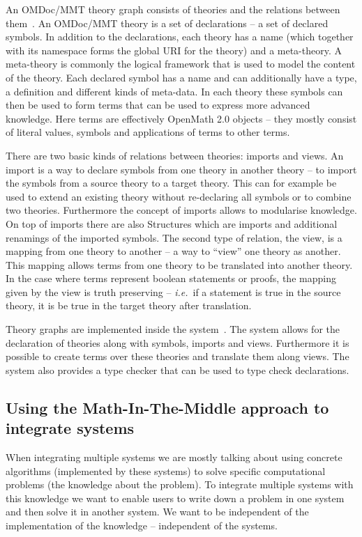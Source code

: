 An OMDoc/MMT theory graph consists of theories and the relations between
them~\cite{RabKoh:WSMSML13}. An OMDoc/MMT theory is a set of declarations -- a set of
declared symbols. In addition to the declarations, each theory has a name (which together
with its namespace forms the global URI for the theory) and a meta-theory. A meta-theory
is commonly the logical framework that is used to model the content of the theory. Each
declared symbol has a name and can additionally have a type, a definition and different
kinds of meta-data. In each theory these symbols can then be used to form terms that can
be used to express more advanced knowledge. Here terms are effectively OpenMath 2.0
\cite{BusCapCar:2oms04} objects -- they mostly consist of literal values, symbols and
applications of terms to other terms.

There are two basic kinds of relations between theories: imports and views. An import is a
way to declare symbols from one theory in another theory -- to import the symbols from a
source theory to a target theory. This can for example be used to extend an existing
theory without re-declaring all symbols or to combine two theories. Furthermore the
concept of imports allows to modularise knowledge. On top of imports there are also
Structures which are imports and additional renamings of the imported symbols. The second
type of relation, the view, is a mapping from one theory to another -- a way to ``view''
one theory as another. This mapping allows terms from one theory to be translated into
another theory. In the case where terms represent boolean statements or proofs, the
mapping given by the view is truth preserving -- \emph{i.e.}~if a statement is true in the
source theory, it is be true in the target theory after translation.

Theory graphs are implemented inside the \MMT system~\cite{Rabe:MAGMS13,uniformal:on}. The
system allows for the declaration of theories along with symbols, imports and
views. Furthermore it is possible to create terms over these theories and translate them
along views. The \MMT system also provides a type checker that can be used to type check
declarations.

\subsection{Using the Math-In-The-Middle approach to integrate systems}\label{sec:mitm}

When integrating multiple systems we are mostly talking about using concrete algorithms
(implemented by these systems) to solve specific computational problems (the knowledge
about the problem). To integrate multiple systems with this knowledge we want to enable
users to write down a problem in one system and then solve it in another system. We want
to be independent of the implementation of the knowledge -- independent of the systems.

